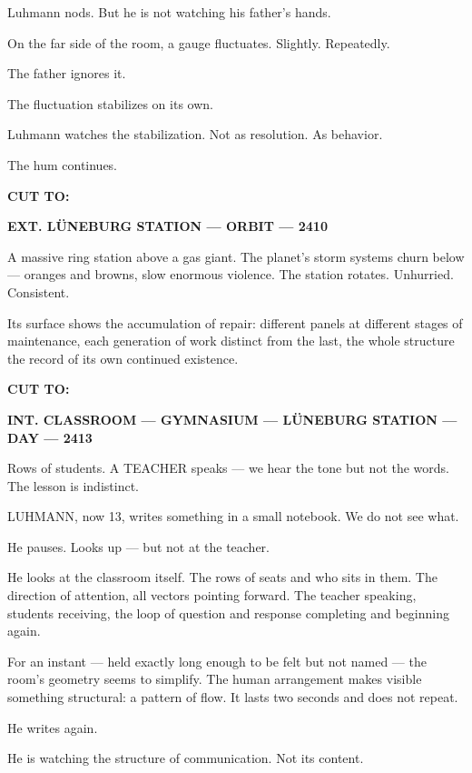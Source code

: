 \documentclass[12pt]{article}
\newcommand{\sceneheading}[1]{%
  \vspace{10pt}%
  \noindent\textbf{#1}%
  \vspace{6pt}%
}
\newcommand{\trans}[1]{%
  \vspace{8pt}%
  \begin{flushright}\textbf{#1}\end{flushright}%
  \vspace{4pt}%
}
\newenvironment{action}{%
  \vspace{4pt}%
  \noindent\ignorespaces%
}{%
  \vspace{6pt}%
}
\begin{document}
\begin{action}
Luhmann nods. But he is not watching his father's hands.

\medskip

On the far side of the room, a gauge fluctuates. Slightly. Repeatedly.

\medskip

The father ignores it.

\medskip

The fluctuation stabilizes on its own.

\medskip

Luhmann watches the stabilization. Not as resolution. As behavior.

\medskip

The hum continues.
\end{action}

\trans{CUT TO:}

\sceneheading{EXT. LÜNEBURG STATION — ORBIT — 2410}

\begin{action}
A massive ring station above a gas giant. The planet's storm systems churn below — oranges and browns, slow enormous violence. The station rotates. Unhurried. Consistent.

Its surface shows the accumulation of repair: different panels at different stages of maintenance, each generation of work distinct from the last, the whole structure the record of its own continued existence.
\end{action}

\trans{CUT TO:}

\sceneheading{INT. CLASSROOM — GYMNASIUM — LÜNEBURG STATION — DAY — 2413}

\begin{action}
Rows of students. A TEACHER speaks — we hear the tone but not the words. The lesson is indistinct.

\medskip

LUHMANN, now 13, writes something in a small notebook. We do not see what.

\medskip

He pauses. Looks up — but not at the teacher.

\medskip

He looks at the classroom itself. The rows of seats and who sits in them. The direction of attention, all vectors pointing forward. The teacher speaking, students receiving, the loop of question and response completing and beginning again.

\medskip

For an instant — held exactly long enough to be felt but not named — the room's geometry seems to simplify. The human arrangement makes visible something structural: a pattern of flow. It lasts two seconds and does not repeat.

\medskip

He writes again.

\medskip

He is watching the structure of communication. Not its content.
\end{action}
\end{document}
